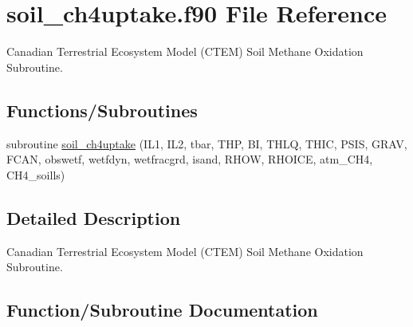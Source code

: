 \hypertarget{soil__ch4uptake_8f90}{}\section{soil\+\_\+ch4uptake.\+f90 File Reference}
\label{soil__ch4uptake_8f90}


Canadian Terrestrial Ecosystem Model (C\+T\+E\+M) Soil Methane Oxidation Subroutine.  


\subsection*{Functions/\+Subroutines}
\begin{DoxyCompactItemize}
\item 
subroutine \hyperlink{soil__ch4uptake_8f90_a6224a4d6e29f37e3d26f6eceeee72372}{soil\+\_\+ch4uptake} (I\+L1, I\+L2, tbar, T\+H\+P, B\+I, T\+H\+L\+Q, T\+H\+I\+C, P\+S\+I\+S, G\+R\+A\+V, F\+C\+A\+N, obswetf, wetfdyn, wetfracgrd, isand, R\+H\+O\+W, R\+H\+O\+I\+C\+E, atm\+\_\+\+C\+H4, C\+H4\+\_\+soills)
\end{DoxyCompactItemize}


\subsection{Detailed Description}
Canadian Terrestrial Ecosystem Model (C\+T\+E\+M) Soil Methane Oxidation Subroutine. 



\subsection{Function/\+Subroutine Documentation}
\hypertarget{soil__ch4uptake_8f90_a6224a4d6e29f37e3d26f6eceeee72372}{}
